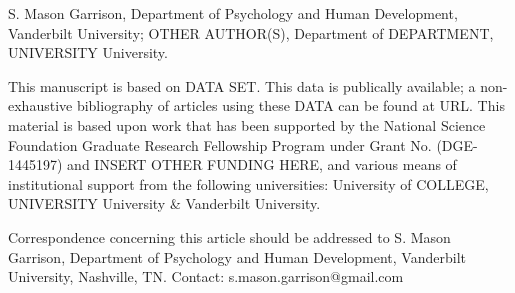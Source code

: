 {\small S. Mason Garrison, Department of Psychology and Human Development, Vanderbilt University; OTHER AUTHOR(S), Department of DEPARTMENT, UNIVERSITY University.

This manuscript is based on DATA SET. This data is publically available; a non-exhaustive bibliography of articles using these DATA can be found at URL. This material is based upon work that has been supported by the National Science Foundation Graduate Research Fellowship Program under Grant No. (DGE-1445197) and INSERT OTHER FUNDING HERE, and various means of institutional support from the following universities: University of COLLEGE, UNIVERSITY University \& Vanderbilt University.

Correspondence concerning this article should be addressed to S. Mason Garrison, Department of Psychology and Human Development, Vanderbilt University, Nashville, TN. Contact: s.mason.garrison@gmail.com}
